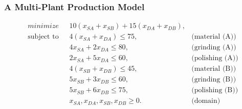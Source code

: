 \documentclass[11pt]{beamer}
\begin{document}
\begin{frame}
\frametitle{A Multi-Plant Production Model}


\pause
\begin{align}
\displaystyle minimize \mbox{ } & 10(x_{SA} + x_{SB}) + 15(x_{DA} + x_{DB}), \label{multi:objective} \\
% 
\mbox{subject to }& 4(x_{SA} + x_{DA}) \leq 75, & \mbox{(material (A))}  \label{multi:material}\\
& 4x_{SA} + 2x_{DA} \leq 80, & \mbox{(grinding (A))}  \label{multi:grinding}\\
& 2x_{SA} + 5x_{DA} \leq 60, & \mbox{(polishing (A))}  \label{multi:polishing}\\
& 4(x_{SB} + x_{DB}) \leq 45, & \mbox{(material (B))}  \label{multi:material1}\\
& 5x_{SB} + 3x_{DB} \leq 60, & \mbox{(grinding (B))}  \label{multi:grinding1}\\
& 5x_{SB} + 6x_{DB} \leq 75, & \mbox{(polishing (B))}  \label{multi:polishing1}\\
& x_{SA}, x_{DA}, x_{SB}, x_{DB} \geq 0. & \mbox{(domain)} \label{multi:domain}
\end{align}
\end{frame}
\end{document}
